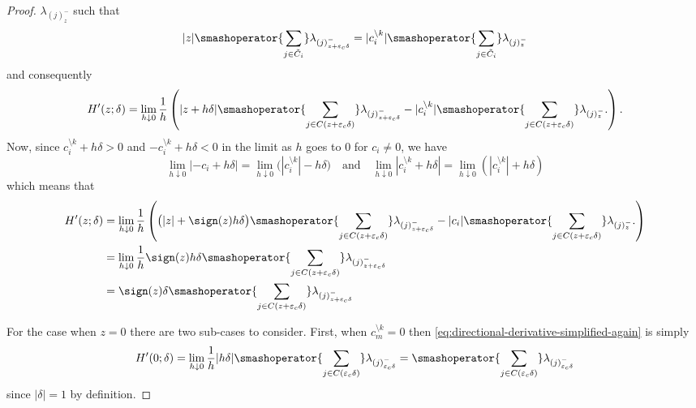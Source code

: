 \begin{proof}
    \(\lambda_{(j)^-_{z}}\) such that
    \[
      |z|\smashoperator{\sum_{j \in \tilde{C}_i}} \lambda_{(j)^-_{z + {\varepsilon_c}\delta}}
      = |c^{\setminus k}_i| \smashoperator{\sum_{j \in \tilde{C}_i}} \lambda_{(j)^-_{z}}
    \]
    and consequently
    \begin{equation}
      \label{eq:directional-derivative-simplified-again}
      H'(z; \delta)
      = \lim_{h \downarrow 0} \frac{1}{h}
      \left(
        |z + h\delta|\smashoperator{\sum_{j \in C(z + {\varepsilon_c}\delta)}} \lambda_{(j)^-_{z + {\varepsilon_c}\delta}}
        - |c_i^{\setminus k}| \smashoperator{\sum_{j \in C(z + {\varepsilon_c}\delta)}} \lambda_{(j)^-_{z}}.
      \right).
    \end{equation}
    Now, since \(c_i^{\setminus k} + h \delta > 0\) and \(-c_i^{\setminus k} + h \delta < 0\) in the limit as
    \(h\) goes to \(0\) for \(c_i \neq 0\), we have
    \[
      \lim_{h\downarrow 0} |-c_i + h \delta|
      = \lim_{h\downarrow 0}\big( |c_i^{\setminus k}| -h \delta\big)
      \quad\text{and}\quad
      \lim_{h\downarrow 0} |c_i^{\setminus k} + h \delta|
      = \lim_{h\downarrow 0}(|c_i^{\setminus k}| + h \delta)
    \]
    which means that
    \begin{align*}
      H'(z; \delta)
       & = \lim_{h \downarrow 0} \frac{1}{h}
      \left(
        \big(|z| + \sign(z)h\delta\big)\smashoperator{\sum_{j \in C(z + {\varepsilon_c}\delta)}} \lambda_{(j)^-_{z + {\varepsilon_c}\delta}}
        - |c_i| \smashoperator{\sum_{j \in C(z + {\varepsilon_c}\delta)}} \lambda_{(j)^-_{z}}.
      \right)                                                                                                                  \\
       & = \lim_{h \downarrow 0} \frac{1}{h}
      \sign(z)h\delta\smashoperator{\sum_{j \in C(z + {\varepsilon_c}\delta)}} \lambda_{(j)^-_{z + {\varepsilon_c}\delta}}     \\
       & = \sign(z)\delta\smashoperator{\sum_{j \in C(z + {\varepsilon_c}\delta)}} \lambda_{(j)^-_{z + {\varepsilon_c}\delta}} \\
    \end{align*}

    For the case when \(z=0\) there are two sub-cases to consider. First, when \(c_m^{\setminus k} = 0\) then
    \eqref{eq:directional-derivative-simplified-again} is simply
    \begin{equation*}
      \label{eq:directional-derivative-zerocase}
      H'(0; \delta)
      = \lim_{h \downarrow 0} \frac{1}{h}
      |h\delta|\smashoperator{\sum_{j \in C({\varepsilon_c}\delta)}} \lambda_{(j)^-_{{\varepsilon_c}\delta}}
      = \smashoperator{\sum_{j \in C({\varepsilon_c}\delta)}} \lambda_{(j)^-_{{\varepsilon_c}\delta}}
    \end{equation*}
    since \(|\delta| = 1\) by definition.


\end{proof}
